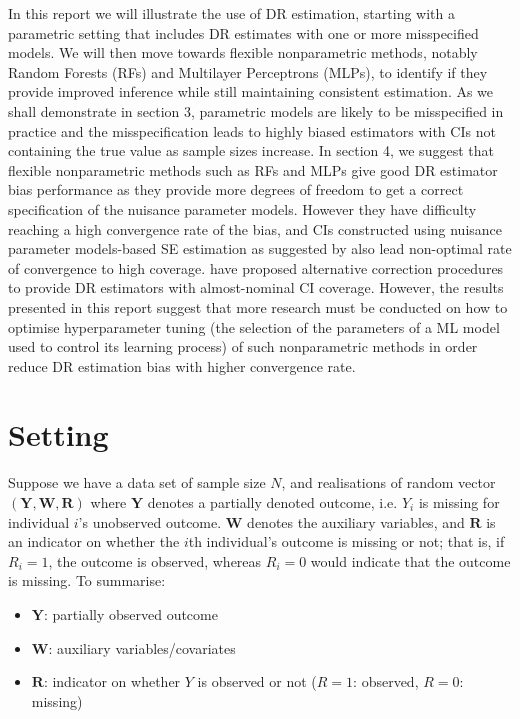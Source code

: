 \documentclass[12pt,twoside]{article}
\begin{document}
In this report we will illustrate the use of DR estimation, starting with a parametric setting that includes DR estimates with one or more misspecified models. We will then move towards flexible nonparametric methods, notably Random Forests (RFs) and Multilayer Perceptrons (MLPs), to identify if they provide improved inference while still maintaining consistent estimation. As we shall demonstrate in section 3, parametric models are likely to be misspecified in practice and the misspecification leads to highly biased estimators with CIs not containing the true value as sample sizes increase. In section 4, we suggest that flexible nonparametric methods such as RFs and MLPs give good DR estimator bias performance as they provide more degrees of freedom to get a correct specification of the nuisance parameter models. However they have difficulty reaching a high convergence rate of the bias, and CIs constructed using nuisance parameter models-based SE estimation as suggested by \cite{davidian} also lead non-optimal rate of convergence to high coverage. \cite{benkeser2017} have proposed alternative correction procedures to provide DR estimators with almost-nominal CI coverage. However, the results presented in this report suggest that more research must be conducted on how to optimise hyperparameter tuning (the selection of the parameters of a ML model used to control its learning process) of such nonparametric methods in order reduce DR estimation bias with higher convergence rate.


\section{Setting} 

Suppose we have a data set of sample size $N$, and realisations of random vector $(\mathbf{Y}, \mathbf{W}, \mathbf{R})$ where $\mathbf{Y}$ denotes a partially denoted outcome, i.e. $Y_i$ is missing for individual $i$'s unobserved outcome. $\mathbf{W}$ denotes the auxiliary variables, and $\mathbf{R}$ is an indicator on whether the $i$th individual's outcome is missing or not; that is, if $R_i = 1$, the outcome is observed, whereas $R_i = 0$ would indicate that the outcome is missing.
To summarise:
\begin{itemize}
    \item $\mathbf{Y}$: partially observed outcome 
    \item $\mathbf{W}$: auxiliary variables/covariates 
    \item $\mathbf{R}$: indicator on whether $Y$ is observed or not ($R = 1$: observed, $R = 0$: missing) 
\end{itemize}
\end{document}
